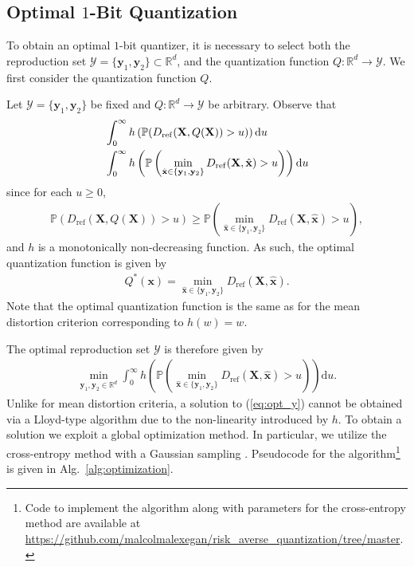 \documentclass[journal]{IEEEtran}
\begin{document}
\subsection{Optimal $1$-Bit Quantization}

To obtain an optimal $1$-bit quantizer, it is necessary to select both the reproduction set $\mathcal{Y} = \{\mathbf{y}_1,\mathbf{y}_2\} \subset \mathbb{R}^d$, and the quantization function $Q: \mathbb{R}^d \rightarrow \mathcal{Y}$. We first consider the quantization function $Q$. 

Let $\mathcal{Y} = \{\mathbf{y}_1,\mathbf{y}_2\}$ be fixed and $Q: \mathbb{R}^d \rightarrow \mathcal{Y}$ be arbitrary. Observe that 
\begin{align}
	&\int_0^{\infty} h\left(\mathbb{P}(D_{\mathrm{ref}}(\mathbf{X},Q(\mathbf{X})) > u)\right)\mathrm{d}u\notag\\
	&\int_0^{\infty} h\left(\mathbb{P}\left(\min_{\hat{\mathbf{x}} \in \{\mathbf{y}_1,\mathbf{y}_2\}} D_{\mathrm{ref}}(\mathbf{X},\hat{\mathbf{x}}) > u\right)\right)\mathrm{d}u
\end{align}
since for each $u \geq 0$, 
\begin{align}
	\mathbb{P}(D_{\mathrm{ref}}(\mathbf{X},Q(\mathbf{X})) > u) \geq \mathbb{P}\left(\min_{\hat{\mathbf{x}} \in \{\mathbf{y}_1,\mathbf{y}_2\}} D_{\mathrm{ref}}(\mathbf{X},\hat{\mathbf{x}}) > u\right),
\end{align}
and $h$ is a monotonically non-decreasing function. As such, the optimal quantization function is given by 
\begin{align}
	Q^*(\mathbf{x}) = \min_{\hat{\mathbf{x}} \in \{\mathbf{y}_1,\mathbf{y}_2\}} D_{\mathrm{ref}}(\mathbf{X},\hat{\mathbf{x}}).
\end{align} 
Note that the optimal quantization function is the same as for the mean distortion criterion corresponding to $h(w) = w$. 

The optimal reproduction set $\mathcal{Y}$ is therefore given by 
\begin{align}\label{eq:opt_y}
	\min_{\mathbf{y}_1,\mathbf{y}_2 \in \mathbb{R}^d} \int_0^{\infty} h\left(\mathbb{P}\left(\min_{\hat{\mathbf{x}} \in \{\mathbf{y}_1,\mathbf{y}_2\}} D_{\mathrm{ref}}(\mathbf{X},\hat{\mathbf{x}}) > u\right)\right)\mathrm{d}u. 
\end{align}
Unlike for mean distortion criteria, a solution to (\ref{eq:opt_y}) cannot be obtained via a Lloyd-type algorithm \cite{Linde1980algorithm} due to the non-linearity introduced by $h$. To obtain a solution we exploit a global optimization method. In particular, we utilize the cross-entropy method with a Gaussian sampling \cite{Botev2013cross}. Pseudocode for the algorithm\footnote{Code to implement the algorithm along with parameters for the cross-entropy method are available at \url{https://github.com/malcolmalexegan/risk_averse_quantization/tree/master}.} is given in Alg.~\ref{alg:optimization}.
\end{document}
